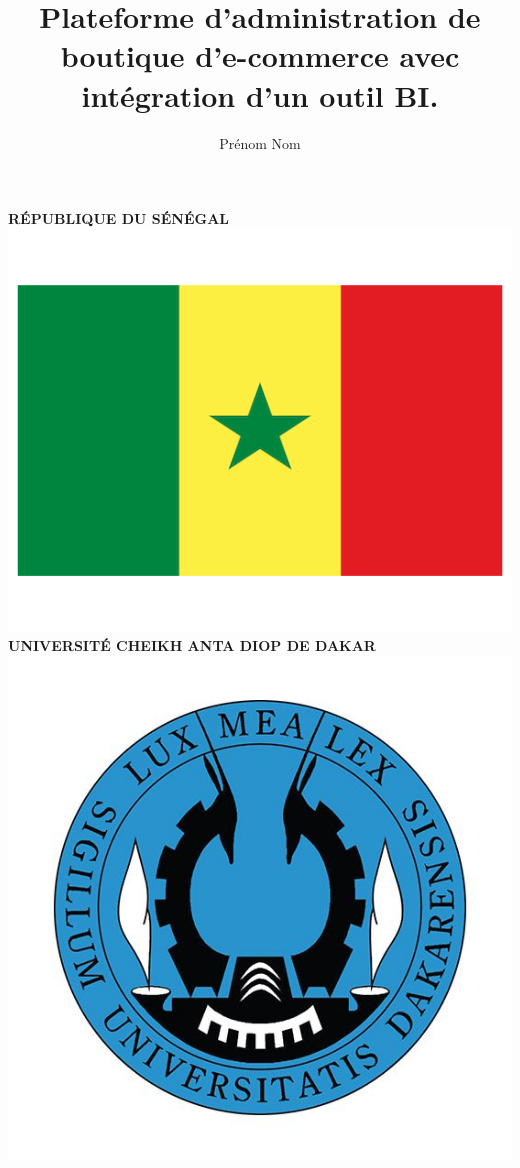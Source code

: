 \documentclass[a4paper, 12pt]{report}
\title{Plateforme d'administration de boutique d'e-commerce avec intégration d'un outil BI.}
\author{Prénom Nom}
\date{}
\begin{document}
\begin{titlepage}

\centering %
 

\textsc{\normalsize \textbf{RÉPUBLIQUE DU SÉNÉGAL}}\\[0.15cm] %
\includegraphics[scale=.1]{img/flag}\\[0.15cm]
\textsc{\small \textbf{UNIVERSITÉ CHEIKH ANTA DIOP DE DAKAR}}\\[0.15cm]
\includegraphics[scale=.2]{img/ucad}\\[0.15cm] %

\end{titlepage}
\end{document}
